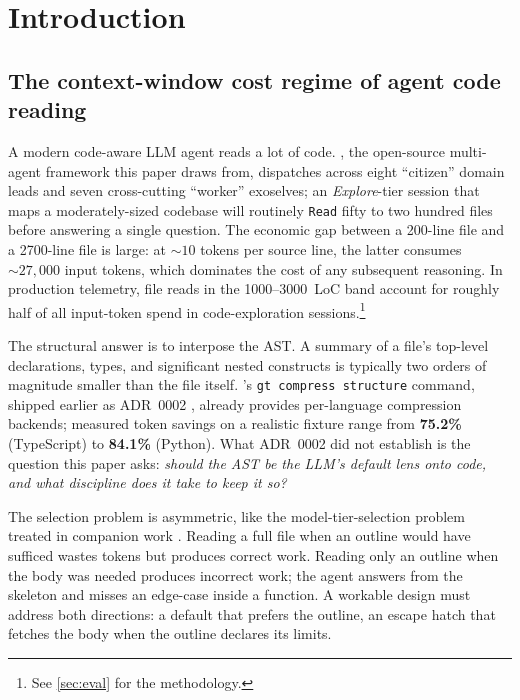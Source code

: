 \section{Introduction}
\label{sec:intro}

\subsection{The context-window cost regime of agent code reading}

A modern code-aware LLM agent reads a lot of code. \blackrim, the
open-source multi-agent framework this paper draws from, dispatches
across eight ``citizen'' domain leads and seven cross-cutting ``worker''
exoselves; an \emph{Explore}-tier session that maps a moderately-sized
codebase will routinely \texttt{Read} fifty to two hundred files
before answering a single question. The economic gap between a 200-line
file and a 2700-line file is large: at $\sim 10$ tokens per source line,
the latter consumes $\sim 27{,}000$ input tokens, which dominates the
cost of any subsequent reasoning. In production \blackrim telemetry,
file reads in the 1000--3000~LoC band account for roughly half of all
input-token spend in code-exploration sessions.\footnote{See
\cref{sec:eval} for the methodology.}

The structural answer is to interpose the AST. A summary of a file's
top-level declarations, types, and significant nested constructs is
typically two orders of magnitude smaller than the file itself.
\blackrim's \texttt{gt compress structure} command, shipped earlier as
ADR~0002 \cite{blackrim_adr_0002}, already provides per-language
compression backends; measured token savings on a realistic fixture
range from \textbf{75.2\%} (TypeScript) to \textbf{84.1\%} (Python).
What ADR~0002 did not establish is the question this paper asks:
\emph{should the AST be the LLM's default lens onto code, and what
discipline does it take to keep it so?}

The selection problem is asymmetric, like the model-tier-selection
problem treated in companion work \cite{blackrim_moa_paper}. Reading a
full file when an outline would have sufficed wastes tokens but produces
correct work. Reading only an outline when the body was needed produces
incorrect work; the agent answers from the skeleton and misses an
edge-case inside a function. A workable design must address both
directions: a default that prefers the outline, an escape hatch that
fetches the body when the outline declares its limits.

